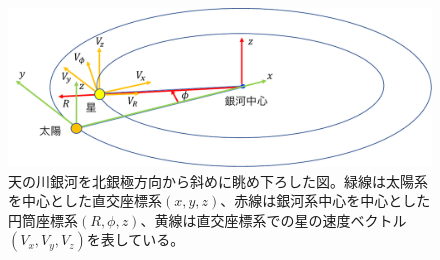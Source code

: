 \begin{figure}[htbp]
\begin{center}
	\includegraphics[width=13cm]{fig/Coordinates.pdf}
	\caption{天の川銀河を北銀極方向から斜めに眺め下ろした図。緑線は太陽系を中心とした直交座標系$(x,y,z)$、赤線は銀河系中心を中心とした円筒座標系$(R,\phi,z)$、黄線は直交座標系での星の速度ベクトル$(V_x,V_y,V_z)$を表している。}
	\label{fig:coordinates}
\end{center}
\end{figure}


